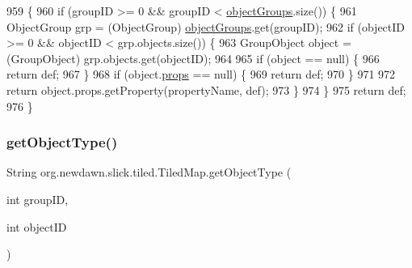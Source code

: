 \begin{DoxyCode}
959                                              \{
960         \textcolor{keywordflow}{if} (groupID >= 0 && groupID < \mbox{\hyperlink{classorg_1_1newdawn_1_1slick_1_1tiled_1_1_tiled_map_aa446ef4b07ea80ab5f112e8512ed7561}{objectGroups}}.size()) \{
961             ObjectGroup grp = (ObjectGroup) \mbox{\hyperlink{classorg_1_1newdawn_1_1slick_1_1tiled_1_1_tiled_map_aa446ef4b07ea80ab5f112e8512ed7561}{objectGroups}}.get(groupID);
962             \textcolor{keywordflow}{if} (objectID >= 0 && objectID < grp.objects.size()) \{
963                 GroupObject \textcolor{keywordtype}{object} = (GroupObject) grp.objects.get(objectID);
964 
965                 \textcolor{keywordflow}{if} (\textcolor{keywordtype}{object} == null) \{
966                     \textcolor{keywordflow}{return} def;
967                 \}
968                 \textcolor{keywordflow}{if} (\textcolor{keywordtype}{object}.\mbox{\hyperlink{classorg_1_1newdawn_1_1slick_1_1tiled_1_1_tiled_map_ace934059dd995f4bda5f4c1534df9d30}{props}} == null) \{
969                     \textcolor{keywordflow}{return} def;
970                 \}
971 
972                 \textcolor{keywordflow}{return} \textcolor{keywordtype}{object}.props.getProperty(propertyName, def);
973             \}
974         \}
975         \textcolor{keywordflow}{return} def;
976     \}
\end{DoxyCode}
\mbox{\label{classorg_1_1newdawn_1_1slick_1_1tiled_1_1_tiled_map_a3403ac0fbe6152da4ed10ab85cd9a6bd}} 
\subsubsection{\texorpdfstring{get\+Object\+Type()}{getObjectType()}}
{\footnotesize\ttfamily String org.\+newdawn.\+slick.\+tiled.\+Tiled\+Map.\+get\+Object\+Type (\begin{DoxyParamCaption}\item[{int}]{group\+ID,  }\item[{int}]{object\+ID }\end{DoxyParamCaption})\hspace{0.3cm}{\ttfamily [inline]}}

